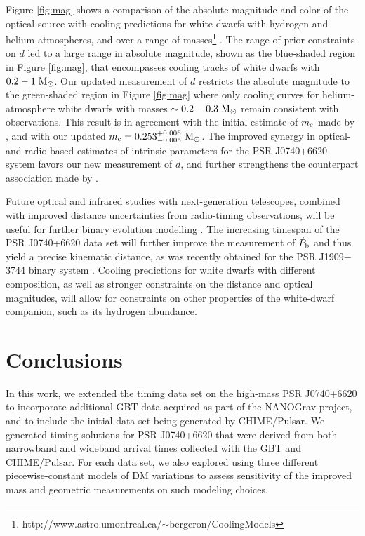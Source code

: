 \documentclass[twocolumn]{aastex63}
\newcommand{\chimepsr}{CHIME/Pulsar}
\newcommand{\pbdot}{$\dot{P}_{\rm b}$}
\begin{document}
Figure \ref{fig:mag} shows a comparison of the absolute magnitude and color of the optical source with cooling predictions for white dwarfs with hydrogen and helium atmospheres, and over a range of masses\footnote{http://www.astro.umontreal.ca/$\sim$bergeron/CoolingModels} \citep{hb06,ks06,tbg11,bwd+11}. The range of prior constraints on $d$ led to a large range in absolute magnitude, shown as the blue-shaded region in Figure \ref{fig:mag}, that encompasses cooling tracks of white dwarfs with $0.2-1\;{\rm M}_\odot$. Our updated measurement of $d$ restricts the absolute magnitude to the green-shaded region in Figure \ref{fig:mag} where only cooling curves for helium-atmosphere white dwarfs with masses $\sim 0.2-0.3 \;{\rm M}_\odot$ remain consistent with observations. This result is in agreement with the initial estimate of $m_{\rm c}$ made by \citet{cfr+20}, and with our updated $m_{\rm c}=0.253^{+0.006}_{-0.005} \textrm{ M}_\odot$. The improved synergy in optical- and radio-based estimates of intrinsic parameters for the PSR J0740+6620 system favors our new measurement of $d$, and further strengthens the counterpart association made by \citet{bkk+19}. 

Future optical and infrared studies with next-generation telescopes, combined with improved distance uncertainties from radio-timing observations, will be useful for further binary evolution modelling \citep{enbd20}. The increasing timespan of the PSR J0740+6620 data set will further improve the measurement of \pbdot{} and thus yield a precise kinematic distance, as was recently obtained for the PSR J1909$-$3744 binary system \citep{lgi+20}. Cooling predictions for white dwarfs with different composition, as well as stronger constraints on the distance and optical magnitudes, will allow for constraints on other properties of the white-dwarf companion, such as its hydrogen abundance. 

\section{Conclusions}
\label{sec:conclusions}

In this work, we extended the timing data set on the high-mass PSR J0740+6620 to incorporate additional GBT data acquired as part of the NANOGrav project, and to include the initial data set being generated by \chimepsr. We generated timing solutions for PSR J0740+6620 that were derived from both narrowband and wideband arrival times collected with the GBT and \chimepsr. For each data set, we also explored using three different piecewise-constant models of DM variations to assess sensitivity of the improved mass and geometric measurements on such modeling choices.
\end{document}
